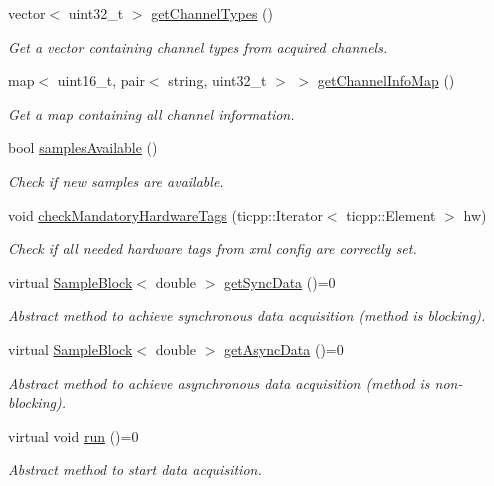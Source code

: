 \begin{DoxyCompactItemize}
vector$<$ uint32\_\-t $>$ \hyperlink{class_h_w_thread_a655f5d40b6ae44cd59db936df49a5c07}{getChannelTypes} ()
\begin{DoxyCompactList}\small\item\em Get a vector containing channel types from acquired channels. \item\end{DoxyCompactList}\item 
map$<$ uint16\_\-t, pair$<$ string, uint32\_\-t $>$ $>$ \hyperlink{class_h_w_thread_a7ea386811b40278f26d54eef9c700c08}{getChannelInfoMap} ()
\begin{DoxyCompactList}\small\item\em Get a map containing all channel information. \item\end{DoxyCompactList}\item 
bool \hyperlink{class_h_w_thread_a240b66ff60434938ca89690cd542dc58}{samplesAvailable} ()
\begin{DoxyCompactList}\small\item\em Check if new samples are available. \item\end{DoxyCompactList}\item 
void \hyperlink{class_h_w_thread_a89a9edf259a4538609b7f4c5be9db14d}{checkMandatoryHardwareTags} (ticpp::Iterator$<$ ticpp::Element $>$ hw)
\begin{DoxyCompactList}\small\item\em Check if all needed hardware tags from xml config are correctly set. \item\end{DoxyCompactList}\item 
virtual \hyperlink{class_sample_block}{SampleBlock}$<$ double $>$ \hyperlink{class_h_w_thread_add1215b3e0f06a856330f2debd7ea2fe}{getSyncData} ()=0
\begin{DoxyCompactList}\small\item\em Abstract method to achieve synchronous data acquisition (method is blocking). \item\end{DoxyCompactList}\item 
virtual \hyperlink{class_sample_block}{SampleBlock}$<$ double $>$ \hyperlink{class_h_w_thread_aa709526a915411a495a947f6bc6e06f9}{getAsyncData} ()=0
\begin{DoxyCompactList}\small\item\em Abstract method to achieve asynchronous data acquisition (method is non-\/blocking). \item\end{DoxyCompactList}\item 
\hypertarget{class_h_w_thread_a2e9f2541e38c3b6b4ef5c28aac570569}{
virtual void \hyperlink{class_h_w_thread_a2e9f2541e38c3b6b4ef5c28aac570569}{run} ()=0}
\label{class_h_w_thread_a2e9f2541e38c3b6b4ef5c28aac570569}

\begin{DoxyCompactList}\small\item\em Abstract method to start data acquisition. \item\end{DoxyCompactList}\end{DoxyCompactItemize}
